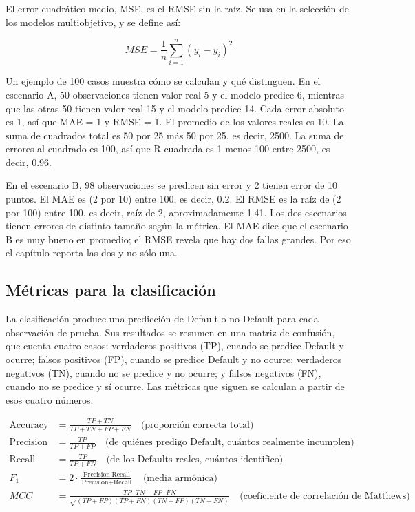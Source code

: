 El error cuadrático medio, MSE, es el RMSE sin la raíz. Se usa en la selección de los modelos multiobjetivo, y se define así:

\begin{equation}
\label{eq:met_mse}
MSE = \frac{1}{n}\sum_{i=1}^n (y_i-\hat{y}_i)^2
\end{equation}

Un ejemplo de 100 casos muestra cómo se calculan y qué distinguen. En el escenario A, 50 observaciones tienen valor real 5 y el modelo predice 6, mientras que las otras 50 tienen valor real 15 y el modelo predice 14. Cada error absoluto es 1, así que MAE = 1 y RMSE = 1. El promedio de los valores reales es 10. La suma de cuadrados total es 50 por 25 más 50 por 25, es decir, 2500. La suma de errores al cuadrado es 100, así que R cuadrada es 1 menos 100 entre 2500, es decir, 0.96.

En el escenario B, 98 observaciones se predicen sin error y 2 tienen error de 10 puntos. El MAE es (2 por 10) entre 100, es decir, 0.2. El RMSE es la raíz de (2 por 100) entre 100, es decir, raíz de 2, aproximadamente 1.41. Los dos escenarios tienen errores de distinto tamaño según la métrica. El MAE dice que el escenario B es muy bueno en promedio; el RMSE revela que hay dos fallas grandes. Por eso el capítulo reporta las dos y no sólo una.

\subsection{Métricas para la clasificación}
La clasificación produce una predicción de Default o no Default para cada observación de prueba. Sus resultados se resumen en una matriz de confusión, que cuenta cuatro casos: verdaderos positivos (TP), cuando se predice Default y ocurre; falsos positivos (FP), cuando se predice Default y no ocurre; verdaderos negativos (TN), cuando no se predice y no ocurre; y falsos negativos (FN), cuando no se predice y sí ocurre. Las métricas que siguen se calculan a partir de esos cuatro números.

\begin{align}
\text{Accuracy} &= \frac{TP+TN}{TP+TN+FP+FN} \quad \text{(proporción correcta total)} \label{eq:met_acc}\\
\text{Precision} &= \frac{TP}{TP+FP} \quad \text{(de quiénes predigo Default, cuántos realmente incumplen)} \label{eq:met_prec}\\
\text{Recall} &= \frac{TP}{TP+FN} \quad \text{(de los Defaults reales, cuántos identifico)} \label{eq:met_rec}\\
F_1 &= 2\cdot\frac{\text{Precision}\cdot\text{Recall}}{\text{Precision}+\text{Recall}} \quad \text{(media armónica)} \label{eq:met_f1}\\
MCC &= \frac{TP\cdot TN - FP\cdot FN}{\sqrt{(TP+FP)(TP+FN)(TN+FP)(TN+FN)}} \quad \text{(coeficiente de correlación de Matthews)} \label{eq:met_mcc}
\end{align}

